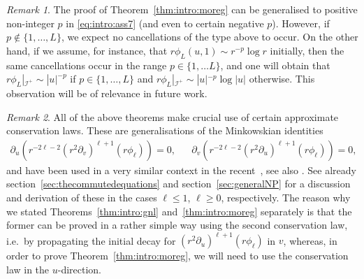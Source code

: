 \documentclass[11pt,english]{article}
\numberwithin{equation}{section}
\theoremstyle{remark}
\newtheorem{rem}{Remark}[section]
\theoremstyle{plain}
\theoremstyle{remark}
\newcommand{\pu}{\partial_u}
\newcommand{\pv}{\partial_v}
\renewcommand{\(}{\left(}
\renewcommand{\)}{\right)}
\begin{document}
\begin{rem}
 The proof of Theorem~\ref{thm:intro:moreg} can be generalised to positive non-integer $p$ in \eqref{eq:intro:ass7} (and even to certain negative $p$). However, if $p\notin\{1,\dots,L\}$, we expect no cancellations of the type above to occur. 
On the other hand, if we assume, for instance,  that $r\phi_L(u,1)\sim r^{-p}\log r $ initially, then the same cancellations occur in the range $p\in\{1,\dots L\}$, and one will obtain that $r\phi_L|_{\mathcal I^+}\sim |u|^{-p}$ if $p\in\{1,\dots, L\}$ and $r\phi_L|_{\mathcal I^+}\sim |u|^{-p}\log|u|$ otherwise.
 This observation will be of relevance in future work.
 
 
 \end{rem}
\begin{rem}\label{rem1.6}
All of the above theorems make crucial use of certain approximate conservation laws. These are generalisations of the Minkowskian identities
\begin{align*}
\pu\left(r^{-2\ell-2}(r^2\pv)^{\ell+1}(r\phi_\ell)\right)=0,&&
\pv\left(r^{-2\ell-2}(r^2\pu)^{\ell+1}(r\phi_\ell)\right)=0,
\end{align*}
and have been used in a very similar context in the recent~\cite{AAG21}, see also \cite{MZ21}. 
See already section~\ref{sec:thecommutedequations} and section~\ref{sec:generalNP} for a discussion and derivation of these in the cases $\ell\leq 1$, $\ell \geq 0$, respectively. 
The reason why we stated Theorems~\ref{thm:intro:gnl} and~\ref{thm:intro:moreg} separately is that the former can be proved in a rather simple way using the second conservation law, i.e.\ by propagating the initial decay for $(r^2\pu)^{\ell+1}(r\phi_\ell)$ in $v$, whereas, in order to prove  Theorem~\ref{thm:intro:moreg}, we will need to use the conservation law in the $u$-direction.
\end{rem}
\end{document}
